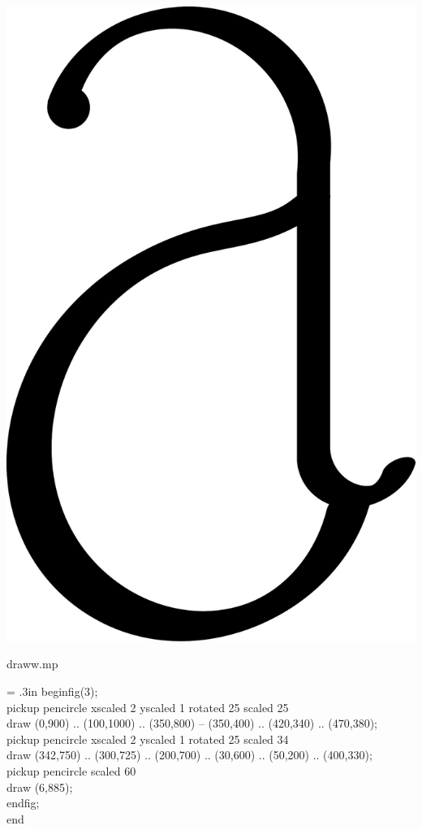 \documentclass[danish,a2paper,11pt]{scrartcl}
\begin{document}
\begin{multicols*}{3}
\center
\includegraphics[scale=.25]{draww-3.pdf}
\vspace{-1cm}

\flushleft
\color{White}
\romansmall
draww.mp\\
\vspace{.4cm}
\color{Black}
\typewritersmall
{\leftskip = .3in
beginfig(3);\\
pickup pencircle xscaled 2 yscaled 1 rotated 25 scaled 25\\
draw (0,900) .. (100,1000) .. (350,800) -- (350,400) .. (420,340) .. (470,380);\\
pickup pencircle xscaled 2 yscaled 1 rotated 25 scaled 34\\
draw (342,750) .. (300,725) .. (200,700) .. (30,600) .. (50,200) .. (400,330);\\
pickup pencircle scaled 60\\
draw (6,885);\\
endfig;\\
end
\par}



\end{multicols*}
\end{document}
